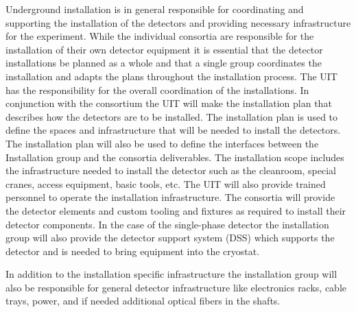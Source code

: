 Underground installation is in general responsible for coordinating
and supporting the installation of the detectors and providing
necessary infrastructure for the experiment. While the individual
consortia are responsible for the installation of their own detector
equipment it is essential that the detector installations be planned
as a whole and that a single group coordinates the installation and
adapts the plans throughout the installation process. The UIT has the
responsibility for the overall coordination of the installations. In
conjunction with the consortium the UIT will make the installation
plan that describes how the detectors are to be installed. The
installation plan is used to define the spaces and infrastructure that
will be needed to install the detectors. The installation plan will
also be used to define the interfaces between the Installation group
and the consortia deliverables.  The installation scope includes the
infrastructure needed to install the detector such as the cleanroom,
special cranes, access equipment, basic tools, etc. The UIT will also
provide trained personnel to operate the installation
infrastructure. The consortia will provide the detector elements and
custom tooling and fixtures as required to install their detector
components. In the case of the single-phase detector the installation
group will also provide the detector support system (DSS) which
supports the detector and is needed to bring equipment into the
cryostat.

In addition to the installation specific infrastructure the
installation group will also be responsible for general detector
infrastructure like electronics racks, cable trays, power, and if
needed additional optical fibers in the shafts.

 







